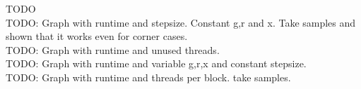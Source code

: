 TODO \\

TODO: Graph with runtime and stepsize. Constant g,r and x. Take samples and shown that it works even for corner cases.\\
TODO: Graph with runtime and unused threads.\\
TODO: Graph with runtime and variable g,r,x and constant stepsize.\\
TODO: Graph with runtime and threads per block. take samples.
